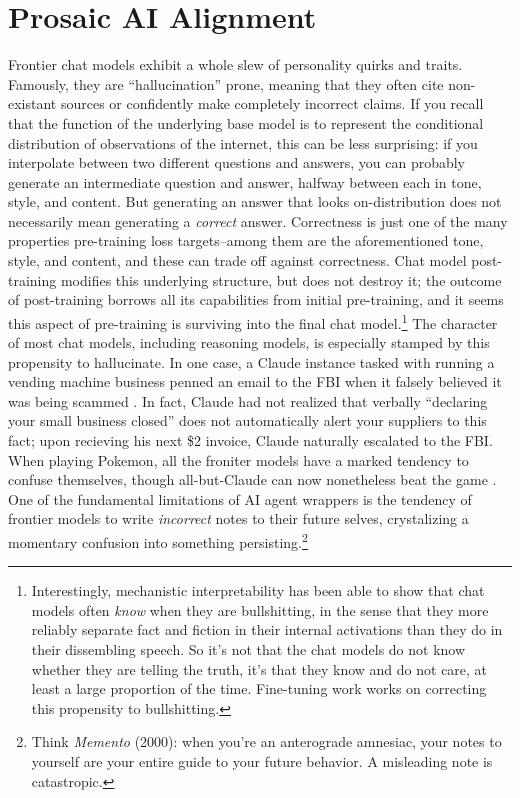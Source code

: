 \section{Prosaic AI Alignment}
Frontier chat models exhibit a whole slew of personality quirks and traits.
Famously, they are ``hallucination'' prone, meaning that they often cite
non-existant sources or confidently make completely incorrect claims. If you
recall that the function of the underlying base model is to represent the
conditional distribution of observations of the internet, this can be less
surprising: if you interpolate between two different questions and answers, you
can probably generate an intermediate question and answer, halfway between each
in tone, style, and content. But generating an answer that looks
on-distribution does not necessarily mean generating a \emph{correct} answer.
Correctness is just one of the many properties pre-training loss targets--among
them are the aforementioned tone, style, and content, and these can trade off
against correctness. Chat model post-training modifies this underlying
structure, but does not destroy it; the outcome of post-training borrows all
its capabilities from initial pre-training, and it seems this aspect of
pre-training is surviving into the final chat model.\footnote{Interestingly,
mechanistic interpretability has been able to show that chat models often
\emph{know} when they are bullshitting, in the sense that they more reliably
separate fact and fiction in their internal activations than they do in their
dissembling speech. So it's not that the chat models do not know whether they
are telling the truth, it's that they know and do not care, at least a large
proportion of the time. Fine-tuning work works on correcting this propensity to
bullshitting.} The character of most chat models, including reasoning models,
is especially stamped by this propensity to hallucinate. In one case, a Claude
instance tasked with running a vending machine business penned an email to the
FBI when it falsely believed it was being scammed \cite{backlund2025vending}.
In fact, Claude had not realized that verbally ``declaring your small business
closed'' does not automatically alert your suppliers to this fact; upon
recieving his next \$2 invoice, Claude naturally escalated to the FBI. When
playing Pokemon, all the froniter models have a marked tendency to confuse
themselves, though all-but-Claude can now nonetheless beat the game \cite{}.
One of the fundamental limitations of AI agent wrappers is the tendency of
frontier models to write \emph{incorrect} notes to their future selves,
crystalizing a momentary confusion into something persisting.\footnote{Think
\emph{Memento} (2000): when you're an anterograde amnesiac, your notes to
yourself are your entire guide to your future behavior. A misleading note is
catastropic.}

